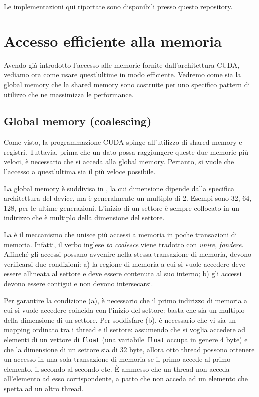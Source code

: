 \begin{note}{}
    Le implementazioni qui riportate sono disponibili presso \href{https://github.com/riccardoregina/High-Performance-Computing}{questo repository}.
\end{note}

\section{Accesso efficiente alla memoria}
Avendo già introdotto l'accesso alle memorie fornite dall'architettura CUDA, vediamo ora come usare quest'ultime in modo efficiente. Vedremo come sia la global memory che la shared memory sono costruite per uno specifico pattern di utilizzo che ne massimizza le performance.

\subsection{Global memory (coalescing)}
Come visto, la programmazione CUDA spinge all'utilizzo di shared memory e registri.
Tuttavia, prima che un dato possa raggiungere queste due memorie più veloci, è necessario che si acceda alla global memory.
Pertanto, si vuole che l'accesso a quest'ultima sia il più veloce possibile.

La global memory è suddivisa in , la cui dimensione dipende dalla specifica architettura del device, ma è generalmente un multiplo di 2. 
Esempi sono 32, 64, 128, per le ultime generazioni. 
L'inizio di un settore è sempre collocato in un indirizzo che è multiplo della dimensione del settore.

La  è il meccanismo che unisce più accessi a memoria in poche transazioni di memoria. Infatti, il verbo inglese \textit{to coalesce} viene tradotto con \textit{unire}, \textit{fondere}.
Affinché gli accessi possano avvenire nella stessa transazione di memoria, devono verificarsi due condizioni: a) la regione di memoria a cui si vuole accedere deve essere allineata al settore e deve essere contenuta al suo interno; b) gli accessi devono essere contigui e non devono intersecarsi.

Per garantire la condizione (a), è necessario che il primo indirizzo di memoria a cui si vuole accedere coincida con l'inizio del settore: basta che sia un multiplo della dimensione di un settore.
Per soddisfare (b), è necessario che vi sia un mapping ordinato tra i thread e il settore: assumendo che si voglia accedere ad elementi di un vettore di \texttt{float} (una variabile \texttt{float} occupa in genere 4 byte) e che la dimensione di un settore sia di 32 byte, allora otto thread possono ottenere un accesso in una sola transazione di memoria se il primo accede al primo elemento, il secondo al secondo etc. 
È ammesso che un thread non acceda all'elemento ad esso corrispondente, a patto che non acceda ad un elemento che spetta ad un altro thread.

